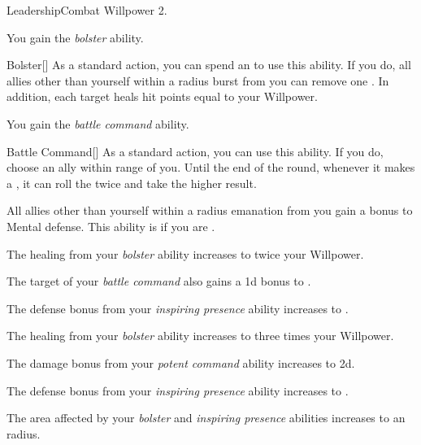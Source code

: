     \begin{feat}{Leadership}{Combat}
        \featpre Willpower 2.

         You gain the \textit{bolster} ability.
        \begin{ability}{Bolster}[]
            As a standard action, you can spend an  to use this ability.
            If you do, all allies other than yourself within a \arealarge radius burst from you can remove one .
            In addition, each target heals hit points equal to your Willpower.
        \end{ability}

         You gain the \textit{battle command} ability.
        \begin{ability}{Battle Command}[]
            As a standard action, you can use this ability.
            If you do, choose an ally within \rngmed range of you.
            Until the end of the round, whenever it makes a , it can roll the  twice and take the higher result.
        \end{ability}

         All allies other than yourself within a \arealarge radius emanation from you gain a  bonus to Mental defense.
        This ability is  if you are .

         The healing from your \textit{bolster} ability increases to twice your Willpower.

         The target of your \textit{battle command} also gains a \plus1d bonus to .

         The defense bonus from your \textit{inspiring presence} ability increases to .

         The healing from your \textit{bolster} ability increases to three times your Willpower.

         The damage bonus from your \textit{potent command} ability increases to \plus2d.

         The defense bonus from your \textit{inspiring presence} ability increases to .

         The area affected by your \textit{bolster} and \textit{inspiring presence} abilities increases to an \areahuge radius.
    \end{feat}


